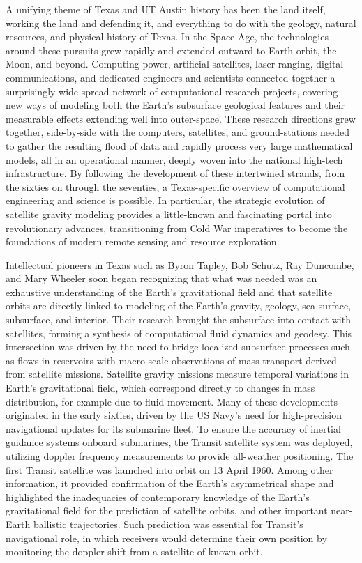 A unifying theme of Texas and UT Austin history has been the land itself, working the land and defending it, and everything to do with the geology, natural resources, and physical history of Texas. In the Space Age, the technologies around these pursuits grew rapidly and extended outward to Earth orbit, the Moon, and beyond. Computing power, artificial satellites, laser ranging, digital communications, and dedicated engineers and scientists connected together a surprisingly wide-spread network of computational research projects, covering new ways of modeling both the Earth’s subsurface geological features and their measurable effects extending well into outer-space. 
These research directions grew together, side-by-side with the computers, satellites, and ground-stations needed to gather the resulting flood of data and rapidly process very large mathematical models, all in an operational manner, deeply woven into the national high-tech infrastructure. By following the development of these intertwined strands, from the sixties on through the seventies, a Texas-specific overview of computational engineering and science is possible. In particular, the strategic evolution of satellite gravity modeling provides a little-known and fascinating portal into revolutionary advances, transitioning from Cold War imperatives to become the foundations of modern remote sensing and resource exploration. 

Intellectual pioneers in Texas such as Byron Tapley, Bob Schutz, Ray Duncombe, and Mary Wheeler soon began recognizing that what was needed was an exhaustive understanding of the Earth’s gravitational field and that satellite orbits are directly linked to modeling of the Earth’s gravity, geology, sea-surface, subsurface, and interior. Their research brought the subsurface into contact with satellites, forming a synthesis of computational fluid dynamics and geodesy. This intersection was driven by the need to bridge localized subsurface processes such as flows in reservoirs with macro-scale observations of mass transport derived from satellite missions. Satellite gravity missions measure temporal variations in Earth’s gravitational field, which correspond directly to changes in mass distribution, for example due to fluid movement. 
Many of these developments originated in the early sixties, driven by the US Navy’s need for high-precision navigational updates for its submarine fleet. To ensure the accuracy of inertial guidance systems onboard submarines, the Transit satellite system was deployed, utilizing doppler frequency measurements to provide all-weather positioning. The first Transit satellite was launched into orbit on 13 April 1960. Among other information, it provided confirmation of the Earth's asymmetrical shape and highlighted the inadequacies of contemporary knowledge of the Earth's gravitational field for the prediction of satellite orbits, and other important near-Earth ballistic trajectories. Such prediction was essential for Transit's navigational role, in which receivers would determine their own position by monitoring the doppler shift from a satellite of known orbit. 

